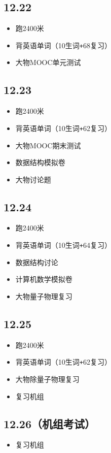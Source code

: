 \documentclass[UTF8]{ctexart}
\begin{document}
\subsection*{12.22}
\begin{itemize}
    \item 跑2400米
    \item 背英语单词（10生词\verb|+|68复习）
    \item 大物MOOC单元测试
\end{itemize}
\subsection*{12.23}
\begin{itemize}
    \item 跑2400米
    \item 背英语单词（10生词\verb|+|62复习）
    \item 大物MOOC期末测试
    \item 数据结构模拟卷
    \item 大物讨论题
\end{itemize}
\subsection*{12.24}
\begin{itemize}
    \item 跑2400米
    \item 背英语单词（10生词\verb|+|64复习）
    \item 数据结构讨论
    \item 计算机数学模拟卷
    \item 大物量子物理复习
\end{itemize}
\subsection*{12.25}
\begin{itemize}
    \item 跑2400米
    \item 背英语单词（10生词\verb|+|62复习）
    \item 大物除量子物理复习
    \item 复习机组
\end{itemize}
\subsection*{12.26（机组考试）}
\begin{itemize}
    \item 复习机组
\end{itemize}
\end{document}
